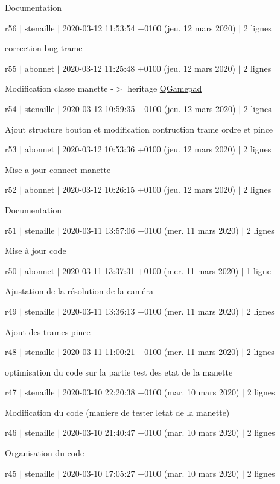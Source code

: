 Documentation

r56 $\vert$ stenaille $\vert$ 2020-\/03-\/12 11\+:53\+:54 +0100 (jeu. 12 mars 2020) $\vert$ 2 lignes

correction bug trame

r55 $\vert$ abonnet $\vert$ 2020-\/03-\/12 11\+:25\+:48 +0100 (jeu. 12 mars 2020) $\vert$ 2 lignes

Modification classe manette -\/$>$ heritage \hyperlink{class_q_gamepad}{Q\+Gamepad}

r54 $\vert$ stenaille $\vert$ 2020-\/03-\/12 10\+:59\+:35 +0100 (jeu. 12 mars 2020) $\vert$ 2 lignes

Ajout structure bouton et modification contruction trame ordre et pince

r53 $\vert$ abonnet $\vert$ 2020-\/03-\/12 10\+:53\+:36 +0100 (jeu. 12 mars 2020) $\vert$ 2 lignes

Mise a jour connect manette

r52 $\vert$ abonnet $\vert$ 2020-\/03-\/12 10\+:26\+:15 +0100 (jeu. 12 mars 2020) $\vert$ 2 lignes

Documentation

r51 $\vert$ stenaille $\vert$ 2020-\/03-\/11 13\+:57\+:06 +0100 (mer. 11 mars 2020) $\vert$ 2 lignes

Mise à jour code

r50 $\vert$ abonnet $\vert$ 2020-\/03-\/11 13\+:37\+:31 +0100 (mer. 11 mars 2020) $\vert$ 1 ligne

Ajustation de la résolution de la caméra

r49 $\vert$ stenaille $\vert$ 2020-\/03-\/11 13\+:36\+:13 +0100 (mer. 11 mars 2020) $\vert$ 2 lignes

Ajout des trames pince

r48 $\vert$ stenaille $\vert$ 2020-\/03-\/11 11\+:00\+:21 +0100 (mer. 11 mars 2020) $\vert$ 2 lignes

optimisation du code sur la partie test des etat de la manette

r47 $\vert$ stenaille $\vert$ 2020-\/03-\/10 22\+:20\+:38 +0100 (mar. 10 mars 2020) $\vert$ 2 lignes

Modification du code (maniere de tester l\textquotesingle{}etat de la manette)

r46 $\vert$ stenaille $\vert$ 2020-\/03-\/10 21\+:40\+:47 +0100 (mar. 10 mars 2020) $\vert$ 2 lignes

Organisation du code

r45 $\vert$ stenaille $\vert$ 2020-\/03-\/10 17\+:05\+:27 +0100 (mar. 10 mars 2020) $\vert$ 2 lignes

